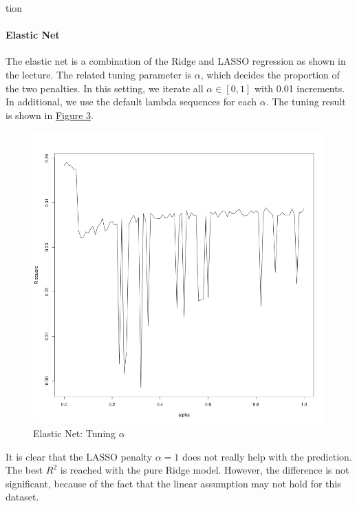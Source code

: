 tion\documentclass[8pt]{article}
\begin{document}
\begin{enumerate}
\paragraph{Elastic Net}
The elastic net is a combination of the Ridge and LASSO regression as shown in the lecture. 
The related tuning parameter is $\alpha$, which decides the proportion of the two penalties. 
In this setting, we iterate all $\alpha \in [0, 1]$ with 0.01 increments. 
In additional, we use the default lambda sequences for each $\alpha$. 
The tuning result is shown in \hyperref[fig:elastic_net]{Figure 3}.
\begin{figure}[H]
    \centering
    \includegraphics*[scale=0.25]{figures/elastic_net.png}
    \caption{Elastic Net: Tuning $\alpha$}
    \label{fig:elastic_net}
\end{figure}
It is clear that the LASSO penalty $\alpha = 1$ does not really help with the prediction.
The best $R^2$ is reached with the pure Ridge model. However, the difference is not significant, 
because of the fact that the linear assumption may not hold for this dataset.

\end{enumerate}
\end{document}
